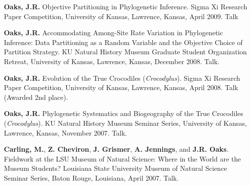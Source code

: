 \myHangIndent
{\bf Oaks, J.R.}
Objective Partitioning in Phylogenetic Inference.
Sigma Xi Research Paper Competition, University of Kansas, Lawrence, Kansas,
April 2009.
Talk

\myHangIndent
{\bf Oaks, J.R.}
Accommodating Among-Site Rate Variation in Phylogenetic Inference: Data
Partitioning as a Random Variable and the Objective Choice of Partition
Strategy.
KU Natural History Museum Graduate Student Organization Retreat, University of
Kansas, Lawrence, Kansas, December 2008.
Talk.

\myHangIndent
{\bf Oaks, J.R.}
Evolution of the True Crocodiles (\emph{Crocodylus}).
Sigma Xi Research Paper Competition, University of Kansas, Lawrence, Kansas, April 2008.
Talk (Awarded 2nd place).

\myHangIndent
{\bf Oaks, J.R.}
Phylogenetic Systematics and Biogeography of the True Crocodiles
(\emph{Crocodylus}).
KU Natural History Museum Seminar Series, University of Kansas, Lawrence,
Kansas, November 2007.
Talk.

\myHangIndent
{\bf Carling, M.}, {\bf Z. Cheviron}, {\bf J. Grismer}, {\bf A. Jennings}, and
{\bf J.R. Oaks}.
Fieldwork at the LSU Museum of Natural Science: Where in the World are the
Museum Students?
Louisiana State University Museum of Natural Science Seminar Series, Baton
Rouge, Louisiana, April 2007.
Talk.

